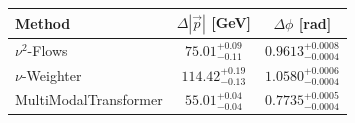     \begin{tabular}{lcc}
        \toprule
        Method & $\Delta |\vec p|$ [GeV] & $\Delta \phi$ [rad] \\
        \midrule
        $\nu^2$-Flows & $75.01^{+0.09}_{-0.11}$ & $0.9613^{+0.0008}_{-0.0004}$ \\
        $\nu$-Weighter & $114.42^{+0.19}_{-0.13}$ & $1.0580^{+0.0006}_{-0.0004}$ \\
        MultiModalTransformer & $55.01^{+0.04}_{-0.04}$ & $0.7735^{+0.0005}_{-0.0004}$ \\
        \bottomrule
    \end{tabular}